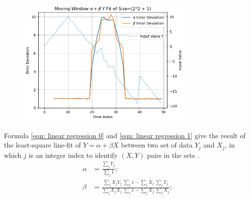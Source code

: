 \documentclass[twoside]{article}
\numberwithin{equation}{section}
\begin{document}
\begin{figure}[p]
\centering
\includegraphics[height=2.5in]{Moving_Linear_Fit_Error.png} 
\label{fig: Moving_Linear_Fit_Error}
\end{figure}



Formula \eqref{eqn: linear regression 0} and \eqref{eqn: linear regression 1} give the result of the least-square line-fit of $Y = \alpha + \beta X$ between two set of data ${Y_j}$ and ${X_j}$, in which $j$ is an integer index to identify $(X, Y)$ pairs in the sets \cite{Numerical_Recipes}.
\begin{align}
\label{eqn: linear regression 0}
\alpha &= \frac{\sum_{j} Y_{j} }{\sum_{j} 1}; \\
\label{eqn: linear regression 1}
\beta &= \frac{\sum_{j} X_{j} Y_{j} \; \sum_{j} 1 - \sum_{j} X_{j} \; \sum_{j} Y_{j}}
    {\sum_{j} X_{j} X_{j} \; \sum_{j} 1 - \sum_{j} X_{j} \; \sum_{j} X_{j} };
\end{align}
\end{document}
